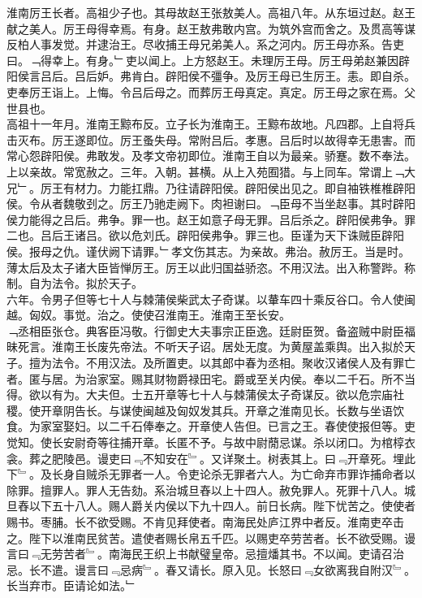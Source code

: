\documentclass{zhvt-classic}
\begin{document}

\hspace*{2em}淮南厉王长者。高祖少子也。其母故赵王张敖美人。高祖八年。从东垣过赵。赵王献之美人。厉王母得幸焉。有身。赵王敖弗敢内宫。为筑外宫而舍之。及贯高等谋反柏人事发觉。并逮治王。尽收捕王母兄弟美人。系之河内。厉王母亦系。告吏曰。﹁得幸上。有身。﹂吏以闻上。上方怒赵王。未理厉王母。厉王母弟赵兼因辟阳侯言吕后。吕后妒。弗肯白。辟阳侯不彊争。及厉王母已生厉王。恚。即自杀。吏奉厉王诣上。上悔。令吕后母之。而葬厉王母真定。真定。厉王母之家在焉。父世县也。\\
\hspace*{2em}高祖十一年月。淮南王黥布反。立子长为淮南王。王黥布故地。凡四郡。上自将兵击灭布。厉王遂即位。厉王蚤失母。常附吕后。孝惠。吕后时以故得幸无患害。而常心怨辟阳侯。弗敢发。及孝文帝初即位。淮南王自以为最亲。骄蹇。数不奉法。上以亲故。常宽赦之。三年。入朝。甚横。从上入苑囿猎。与上同车。常谓上﹁大兄﹂。厉王有材力。力能扛鼎。乃往请辟阳侯。辟阳侯出见之。即自袖铁椎椎辟阳侯。令从者魏敬刭之。厉王乃驰走阙下。肉袒谢曰。﹁臣母不当坐赵事。其时辟阳侯力能得之吕后。弗争。罪一也。赵王如意子母无罪。吕后杀之。辟阳侯弗争。罪二也。吕后王诸吕。欲以危刘氏。辟阳侯弗争。罪三也。臣谨为天下诛贼臣辟阳侯。报母之仇。谨伏阙下请罪。﹂孝文伤其志。为亲故。弗治。赦厉王。当是时。薄太后及太子诸大臣皆惮厉王。厉王以此归国益骄恣。不用汉法。出入称警跸。称制。自为法令。拟於天子。\\
\hspace*{2em}六年。令男子但等七十人与棘蒲侯柴武太子奇谋。以輂车四十乘反谷口。令人使闽越。匈奴。事觉。治之。使使召淮南王。淮南王至长安。\\
\hspace*{2em}﹁丞相臣张仓。典客臣冯敬。行御史大夫事宗正臣逸。廷尉臣贺。备盗贼中尉臣福昧死言。淮南王长废先帝法。不听天子诏。居处无度。为黄屋盖乘舆。出入拟於天子。擅为法令。不用汉法。及所置吏。以其郎中春为丞相。聚收汉诸侯人及有罪亡者。匿与居。为治家室。赐其财物爵禄田宅。爵或至关内侯。奉以二千石。所不当得。欲以有为。大夫但。士五开章等七十人与棘蒲侯太子奇谋反。欲以危宗庙社稷。使开章阴告长。与谋使闽越及匈奴发其兵。开章之淮南见长。长数与坐语饮食。为家室娶妇。以二千石俸奉之。开章使人告但。已言之王。春使使报但等。吏觉知。使长安尉奇等往捕开章。长匿不予。与故中尉蕑忌谋。杀以闭口。为棺椁衣衾。葬之肥陵邑。谩吏曰﹃不知安在﹄。又详聚土。树表其上。曰﹃开章死。埋此下﹄。及长身自贼杀无罪者一人。令吏论杀无罪者六人。为亡命弃市罪诈捕命者以除罪。擅罪人。罪人无告劾。系治城旦舂以上十四人。赦免罪人。死罪十八人。城旦舂以下五十八人。赐人爵关内侯以下九十四人。前日长病。陛下忧苦之。使使者赐书。枣脯。长不欲受赐。不肯见拜使者。南海民处庐江界中者反。淮南吏卒击之。陛下以淮南民贫苦。遣使者赐长帛五千匹。以赐吏卒劳苦者。长不欲受赐。谩言曰﹃无劳苦者﹄。南海民王织上书献璧皇帝。忌擅燔其书。不以闻。吏请召治忌。长不遣。谩言曰﹃忌病﹄。春又请长。原入见。长怒曰﹃女欲离我自附汉﹄。长当弃市。臣请论如法。﹂\\
\end{document}
